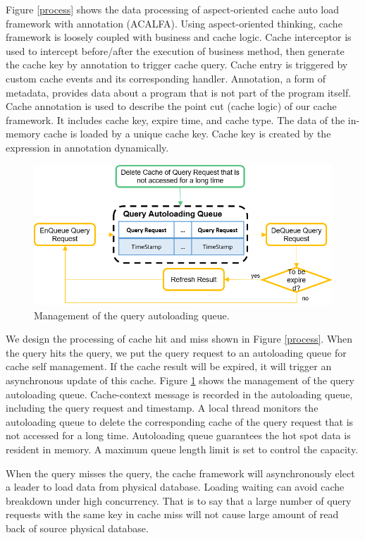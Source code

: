 \documentclass{singlecol-new}
\theoremstyle{TH}{
\newtheorem{lemma}{Lemma}
\newtheorem{theorem}[lemma]{Theorem}
\newtheorem{corrolary}[lemma]{Corrolary}
\newtheorem{conjecture}[lemma]{Conjecture}
\newtheorem{proposition}[lemma]{Proposition}
\newtheorem{claim}[lemma]{Claim}
\newtheorem{stheorem}[lemma]{Wrong Theorem}
}
\theoremstyle{THrm}{
\newtheorem{definition}{Definition}[section]
\newtheorem{question}{Question}[section]
\newtheorem{remark}{Remark}
\newtheorem{scheme}{Scheme}
}
\theoremstyle{THhit}{
\newtheorem{case}{Case}[section]
}
\begin{document}
Figure \ref{process} shows the data processing of aspect-oriented cache auto load framework with annotation (ACALFA). Using aspect-oriented thinking, cache framework is loosely coupled with business and cache logic. Cache interceptor is used to intercept before/after the execution of business method, then generate the cache key by annotation to trigger cache query. Cache entry is triggered by custom cache events and its corresponding handler. Annotation, a form of metadata, provides data about a program that is not part of the program itself. Cache annotation is used to describe the point cut (cache logic) of our cache framework. It includes cache key, expire time, and cache type. The data of the in-memory cache is loaded by a unique cache key. Cache key is created by the expression in annotation dynamically.

\begin{figure} [htb]
\centering
\includegraphics[width=1.0\linewidth]{img/autoloading}
\caption{\label{autoloading}Management of the query autoloading queue.}
\end{figure}

We design the processing of cache hit and miss shown in Figure \ref{process}. When the query hits the query, we put the query request to an autoloading queue for cache self management. If the cache result will be expired, it will trigger an asynchronous update of this cache. Figure \ref{autoloading} shows the management of the query autoloading queue. Cache-context message is recorded in the autoloading queue, including the query request and timestamp. A local thread monitors the autoloading queue to delete the corresponding cache of the query request that is not accessed for a long time. Autoloading queue guarantees the hot spot data is resident in memory. A maximum queue length limit is set to control the capacity.

When the query misses the query, the cache framework will asynchronously elect a leader to load data from physical database. Loading waiting can avoid cache breakdown under high concurrency. That is to say that a large number of query requests with the same key in cache miss will not cause large amount of read back of source physical database.
\end{document}
